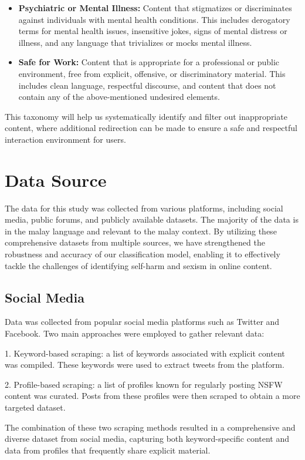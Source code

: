 \documentclass[preprint]{article}
\begin{document}
\begin{itemize}
    \item \textbf{Psychiatric or Mental Illness:} Content that stigmatizes or discriminates against individuals with mental health conditions. This includes derogatory terms for mental health issues, insensitive jokes, signs of mental distress or illness, and any language that trivializes or mocks mental illness.

    \item \textbf{Safe for Work:} Content that is appropriate for a professional or public environment, free from explicit, offensive, or discriminatory material. This includes clean language, respectful discourse, and content that does not contain any of the above-mentioned undesired elements.
\end{itemize}

This taxonomy will help us systematically identify and filter out inappropriate content, where additional redirection can be made to ensure a safe and respectful interaction environment for users.

\section{Data Source}
The data for this study was collected from various platforms, including social media, public forums, and publicly available datasets. The majority of the data is in the malay language and relevant to the malay context.
By utilizing these comprehensive datasets from multiple sources, we have strengthened the robustness and accuracy of our classification model, enabling it to effectively tackle the challenges of identifying self-harm and sexism in online content.
\subsection{Social Media}
Data was collected from popular social media platforms such as Twitter and Facebook. Two main approaches were employed to gather relevant data:

1. Keyword-based scraping: a list of keywords associated with explicit content was compiled. These keywords were used to extract tweets from the platform.

2. Profile-based scraping: a list of profiles known for regularly posting NSFW content was curated. Posts from these profiles were then scraped to obtain a more targeted dataset.

The combination of these two scraping methods resulted in a comprehensive and diverse dataset from social media, capturing both keyword-specific content and data from profiles that frequently share explicit material.
\end{document}
